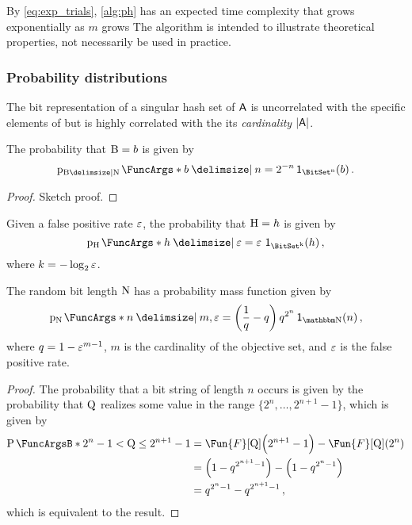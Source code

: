 \documentclass[ ../main.tex]{subfiles}
\begin{document}
By \cref{eq:exp_trials}, \cref{alg:ph} has an expected time complexity that grows exponentially as $m$ grows The algorithm is intended to illustrate theoretical properties, not necessarily be used in practice.

\subsubsection{Probability distributions}
The bit representation of a singular hash set of $\Set{A}$ is uncorrelated with the specific elements of but is highly correlated with the its \emph{cardinality} $\Card{\Set{A}}$.



The probability that $\mathrm{B} = b$ is given by
\begin{equation}
\PDF{b \Given n}[\RV{B} \Given \RV{N}] = 2^{-n} \SetIndicator{\BitSet^n}(b)\,.
\end{equation}
\begin{proof}
Sketch proof.
\end{proof}




Given a false positive rate $\varepsilon$, the probability that $\mathrm{H} = h$ is given by
\begin{equation}
	\PDF{h \Given \fprate}[\RV{H}] = \fprate \, \SetIndicator{\BitSet^k}(h)\,,
\end{equation}
where $k = -\log_2 \varepsilon$.



\begin{theorem}
	The random bit length $\mathrm{N}$ has a probability mass function given by
	\begin{equation}
	\label{eq:N_pmf}
	\PDF{n \Given m, \fprate}[\RV{N}] = \left(\frac{1}{q}-q\right) q^{2^n} \SetIndicator{\NatSet}(n)\,,	
	\end{equation}
	where $q = 1 - \varepsilon^{m-1}$, $m$ is the cardinality of the objective set, and $\varepsilon$ is the false positive rate.
\end{theorem}
\begin{proof}
The probability that a bit string of length $n$ occurs is given by the probability that $\mathrm{Q}$ realizes some value in the range $\{2^n, \ldots, 2^{n+1}-1\}$, which is given by
\begin{align}
	\Prob{2^n-1 < \RV{Q} \leq 2^{n+1}-1}
		&= \Fun{F}[\RV{Q}]\!\left(2^{n+1}-1\right)-\Fun{F}[\RV{Q}]\!\left(2^n\right)\\
		&= \left(1-q^{2^{n+1}-1}\right) - \left(1-q^{2^n-1}\right)\\		
		&= q^{2^n-1} - q^{2^{n+1}-1}\,,
\end{align}
which is equivalent to the result.
\end{proof}
\end{document}
